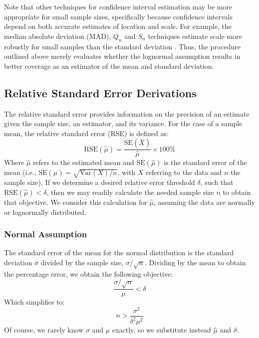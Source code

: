 Note that other techniques for confidence interval estimation may be more appropriate for small sample sizes, specifically because confidence intervals depend on both accurate estimates of location and scale. For example, the median absolute deviation (MAD), $Q_n$ and $S_n$ techniques estimate scale more robustly for small samples than the standard deviation \cite{rousseeuw1993alternatives}. Thus, the procedure outlined above merely evaluates whether the lognormal assumption results in better coverage as an estimator of the mean and standard deviation.



\subsection{Relative Standard Error Derivations}
\label{sec:si_rse}

The relative standard error provides information on the precision of an estimate given the sample size, an estimator, and its variance. For the case of a sample mean, the relative standard error (RSE) is defined as:
\begin{equation}
 \text{RSE}(\hat{\mu}) = \frac{\text{SE}(\bar{X})}{\hat{\mu}}\times 100\% 
\end{equation}
Where $\hat{\mu}$ refers to the estimated mean and $\text{SE}(\hat{\mu})$ is the standard error of the mean (i.e., $\text{SE}(\hat{\mu})=\sqrt{\text{Var}(X)/n}$, with $X$ referring to the data and $n$ the sample size). If we determine a desired relative error threshold $\delta$, such that $\text{RSE}(\hat{\mu}) < \delta$, then we may readily calculate the needed sample size $n$ to obtain that objective. We consider this calculation for $\hat{\mu}$, assuming the data are normally or lognormally distributed.

\subsubsection{Normal Assumption}
\label{sec:si_rse_normal}

The standard error of the mean for the normal distribution is the standard deviation $\sigma$ divided by the sample size, $\sigma/\sqrt{n}$. Dividing by the mean to obtain the percentage error, we obtain the following objective:
\begin{equation}
 \frac{\sigma / \sqrt{n}}{\mu} < \delta
\end{equation}
Which simplifies to:
\begin{equation}
 n > \frac{\sigma^2}{\delta^2\mu^2}
\end{equation}
Of course, we rarely know $\sigma$ and $\mu$ exactly, so we substitute instead $\hat{\mu}$ and $\hat{\sigma}$.


